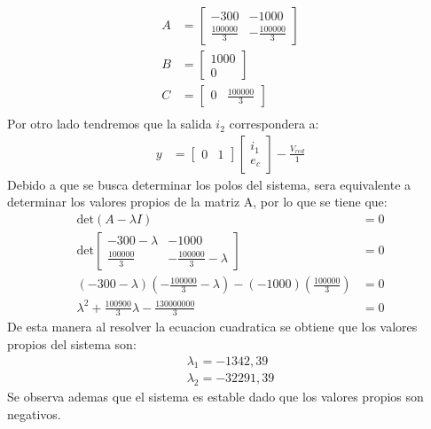 \documentclass[
  11pt,
  letterpaper,
   addpoints,
   answers
  ]{exam}
\begin{document}
\begin{questions}
\begin{solution}
        \begin{align}
            A &=
            \begin{bmatrix}
                -300 & -1000\\
                \frac{100000}{3} & -\frac{100000}{3}
            \end{bmatrix}\\
            B &=
            \begin{bmatrix}
                1000\\
                0
            \end{bmatrix}\\
            C &=
            \begin{bmatrix}
                0 & \frac{100000}{3}
            \end{bmatrix}\\
        \end{align}
        Por otro lado tendremos que la salida $i_{2}$ correspondera a:
        \begin{align}
            y &=
            \begin{bmatrix}
                0 & 1
            \end{bmatrix}
            \begin{bmatrix}
                i_{1}\\
                e_{c}
            \end{bmatrix}
            -\frac{V_{red}}{1}
        \end{align}
        Debido a que se busca determinar los polos del sistema, sera equivalente a determinar los valores propios de la matriz A, por lo que se tiene que:
        \begin{align}
            \text{det}(A - \lambda I) &= 0\\
            \text{det}
            \begin{bmatrix}
                -300 - \lambda & -1000\\
                \frac{100000}{3} & -\frac{100000}{3} - \lambda
            \end{bmatrix}
            &= 0\\
            (-300 - \lambda)(-\frac{100000}{3} - \lambda) - (-1000)(\frac{100000}{3}) &= 0\\
            \lambda^{2} + \frac{100900}{3}\lambda - \frac{130000000}{3} &= 0
        \end{align}
        De esta manera al resolver la ecuacion cuadratica se obtiene que los valores propios del sistema son:
        \begin{align}
            \lambda_{1} =  - 1342,39\\
            \lambda_{2} =  -32291,39
        \end{align}
        Se observa ademas que el sistema es estable dado que los valores propios son negativos.

\end{solution}
\end{questions}
\end{document}
